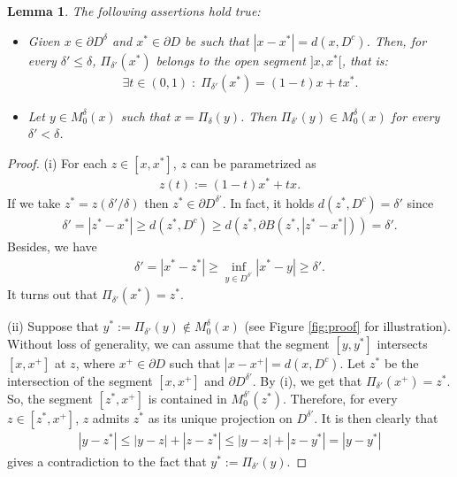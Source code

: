 \documentclass[reqno,11pt]{amsart}
\newtheorem{lemma}[theorem]{Lemma}
\theoremstyle{definition}
\numberwithin{equation}{section}
\newcommand{\1}{{{\bf 1}\kern-0,28em\rm l}}
\def\sepa{\; : \;}
\def\proj{\Pi}
\begin{document}
\begin{lemma}
The following assertions hold true:\label{lem:mod1}
\begin{itemize}
\item[(i)] Given $x\in\partial D^\delta$ and $x^*\in \partial D$ be such that $|x-x^*|=d(x,D^c)$. Then, for every $\delta'\le \delta$, $\proj_{\delta'} (x^*)$ belongs to the open segment $]x,x^*[$, that is: 
\begin{align*}
\exists t\in (0,1) \sepa \proj_{\delta'} (x^*)= (1-t) x+ t x^*.
\end{align*}

\item[(ii)] Let  $y\in M^\delta_0(x)$ such that $x=\proj_\delta (y)$. Then   $\proj_{\delta'} (y) \in M^\delta_0 (x)$ for every $\delta'<\delta$.
\end{itemize}
\end{lemma}

\begin{proof}
(i)
For each $z\in[x,x^*]$, $z$ can be parametrized as
\begin{align*}
z(t):= (1-t)x^* + tx.
\end{align*}
If we take $z^*=z(\delta'/\delta)$ then $z^*\in \partial D^{\delta'}$. In fact, it holds $d(z^*,D^c)=\delta'$ since
\begin{align*}
\delta' = |z^* - x^*| \ge d(z^*,D^c) \ge d(z^*,\partial B(z^*,|z^*-x^*|))=\delta'.
\end{align*}
Besides, we have
\begin{align*}
\delta' = | x^* - z^*| \ge \inf_{y\in D^{\delta'}} |x^* - y| \ge \delta'.
\end{align*}
It turns out that $\proj_{\delta'} (x^*)=z^*$. 

%
%


(ii) 
Suppose that $y^*:= \proj_{\delta'} (y) \notin M^\delta_0 (x)$ (see Figure \ref{fig:proof} for illustration). Without loss of generality, we can assume that the segment $[y,y^*]$ intersects $[x,x^+]$ at $z$, where $x^+\in \partial D$ such that $|x-x^+|=d(x,D^c)$. Let $z^*$ be the intersection of the segment $[x,x^+]$ and $\partial D^{\delta'}$. By (i), we get that $\proj_{\delta'} (x^+)=z^*$. So, the segment $[z^*,x^+]$ is contained in $ M^{\delta'}_0 (z^*)$. 
Therefore, for every $z\in [z^*,x^+]$, $z$ admits $z^*$ as its unique projection on $D^{\delta'}$. It is then clearly that
\begin{align*}
|y-z^*|\le |y-z|+|z-z^*| \le |y-z| + |z-y^*|=|y-y^*|
\end{align*}
gives a contradiction to the fact that $y^*:= \proj_{\delta'} (y)$.
\end{proof}
\end{document}
